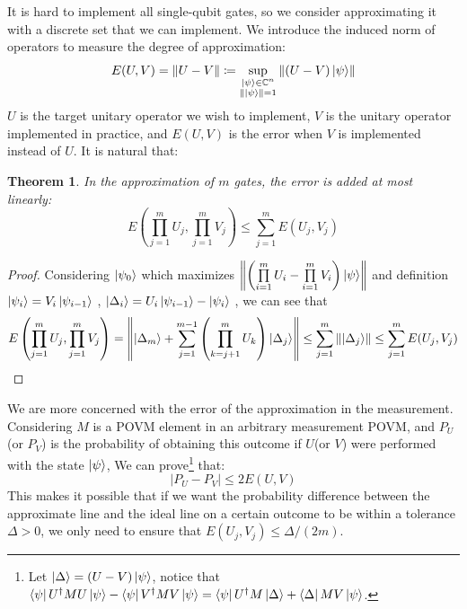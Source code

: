 \documentclass[a4paper,10pt]{book}
\newtheorem{theorem}{Theorem}[section]
\numberwithin{equation}{section}
\begin{document}
It is hard to implement all single-qubit gates, so we consider approximating it with a discrete set that we can implement. We introduce the induced norm of operators to measure the degree of approximation:
\begin{equation}
    E(U,V) = \left\| U-V \right\| \coloneqq \sup\limits_{\substack{\ket{\psi} \in \mathbb{C}^{n} \\ \left\| \ket{\psi} \right\| = 1}} \left\| (U-V)\ket{\psi} \right\|
\end{equation}
$U$ is the target unitary operator we wish to implement, $V$ is the unitary operator implemented in practice, and $E(U,V)$ is the error when $V$ is implemented instead of $U$. It is natural that:
\begin{theorem}
    In the approximation of $m$ gates, the error is added at most linearly:
    \begin{equation}
        E\left(\prod\limits_{j=1}^{m}U_{j},\prod\limits_{j=1}^{m}V_{j}\right) \leq \sum_{j=1}^{m} E(U_{j},V_{j})
    \end{equation}
\end{theorem}
\begin{proof}
    Considering $\ket{\psi_{0}}$ which maximizes $\left\|\left(\prod\limits_{i=1}^{m}U_{i} -  \prod\limits_{i=1}^{m}V_{i}\right)\ket{\psi}\right\|$ and definition $\ket{\psi_{i}} = V_{i}\ket{\psi_{i-1}}$ , $\ket{\Delta_{i}} = U_{i}\ket{\psi_{i-1}} - \ket{\psi_{i}}$ , we can see that
    \begin{equation*}
        E\left(\prod_{j=1}^{m}U_{j},\prod\limits_{j=1}^{m}V_{j}\right) = \left\|\ket{\Delta_{m}} + \sum\limits_{j=1}^{m-1} \left(\prod_{k=j+1}^{m}U_{k}\right)\ket{\Delta_{j}}\right\| \leq \sum\limits_{j=1}^{m} \left\|\ket{\Delta_{j}}\right\| \leq \sum_{j=1}^{m} E(U_{j},V_{j}) \qedhere
    \end{equation*}
\end{proof}


We are more concerned with the error of the approximation in the measurement. Considering $M$ is a POVM element in an arbitrary measurement POVM, and $P_{U}$(or $P_{V}$) is the probability of obtaining this outcome if $U$(or $V$) were performed with the state $\ket{\psi}$, We can prove\footnote{Let $\ket{\Delta} = (U-V)\ket{\psi}$, notice that $\bra{\psi}U^{\dagger}MU\ket{\psi} - \bra{\psi}V^{\dagger}MV\ket{\psi} = \bra{\psi}U^{\dagger}M\ket{\Delta} + \bra{\Delta}MV\ket{\psi}$. } that:
\begin{equation}
    \left| P_{U} - P_{V} \right| \leq 2E(U,V)
\end{equation}
This makes it possible that if we want the probability difference between the approximate line and the ideal line on a certain outcome to be within a tolerance $\Delta > 0$, we only need to ensure that $E(U_{j},V_{j}) \leq \Delta/(2m)$.
\end{document}
